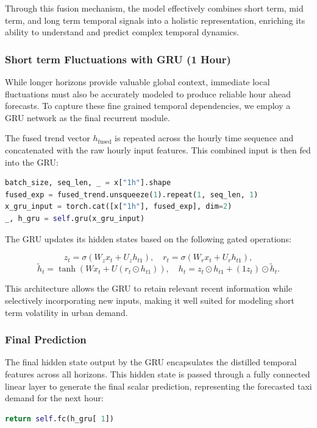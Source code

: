 \documentclass{article}
\begin{document}
Through this fusion mechanism, the model effectively combines short term, mid term, and long term temporal signals into a holistic representation, enriching its ability to understand and predict complex temporal dynamics.

\subsubsection{Short term Fluctuations with GRU (1 Hour)}

While longer horizons provide valuable global context, immediate local fluctuations must also be accurately modeled to produce reliable hour ahead forecasts. To capture these fine grained temporal dependencies, we employ a GRU network as the final recurrent module.

The fused trend vector $h_{\text{fused}}$ is repeated across the hourly time sequence and concatenated with the raw hourly input features. This combined input is then fed into the GRU:

\begin{lstlisting}[language=Python]
batch_size, seq_len, _ = x["1h"].shape
fused_exp = fused_trend.unsqueeze(1).repeat(1, seq_len, 1)
x_gru_input = torch.cat([x["1h"], fused_exp], dim=2)
_, h_gru = self.gru(x_gru_input)
\end{lstlisting}

The GRU updates its hidden states based on the following gated operations:

\[
z_t = \sigma(W_z x_t + U_z h_{t 1}), \quad
r_t = \sigma(W_r x_t + U_r h_{t 1}),
\]
\[
\tilde{h}_t = \tanh(W x_t + U (r_t \odot h_{t 1})), \quad
h_t = z_t \odot h_{t 1} + (1   z_t) \odot \tilde{h}_t.
\]

This architecture allows the GRU to retain relevant recent information while selectively incorporating new inputs, making it well suited for modeling short term volatility in urban demand.

\subsubsection{Final Prediction}

The final hidden state output by the GRU encapsulates the distilled temporal features across all horizons. This hidden state is passed through a fully connected linear layer to generate the final scalar prediction, representing the forecasted taxi demand for the next hour:

\begin{lstlisting}[language=Python]
return self.fc(h_gru[ 1])
\end{lstlisting}
\end{document}
